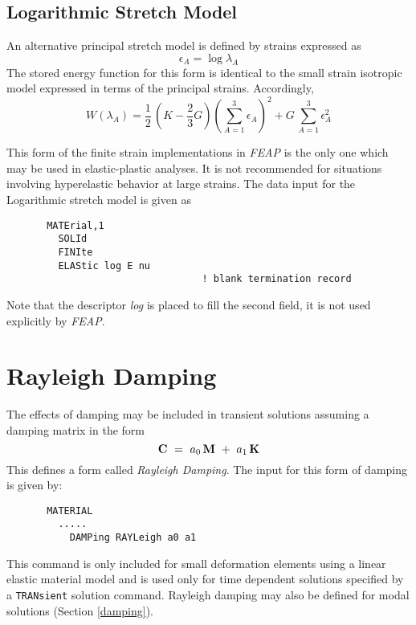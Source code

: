 \subsection{Logarithmic Stretch Model}

An alternative principal stretch model is defined by strains expressed as
\begin{equation}
\epsilon_A = \log{ \lambda_A }
\end{equation}
The stored energy function for this form is identical to the small
strain isotropic model expressed in terms of the principal strains.
Accordingly,
\begin{equation}
W( \lambda_A ) = \frac{1}{2} \, 
\left( K - \frac{2}{3} G \right) \left( \sum_{A=1}^3 \epsilon_A \right)^2
+ G \, \sum_{A=1}^3 \epsilon_A^2
\end{equation}

This form of the finite strain implementations in {\sl FEAP} is the only
one which may be used in elastic-plastic analyses.
It is not recommended for situations involving hyperelastic behavior at
large strains.
The data input for the Logarithmic stretch  model is given as
\begin{verbatim}
       MATErial,1
         SOLId
         FINIte
         ELAStic log E nu
                                  ! blank termination record
\end{verbatim}
Note that the descriptor {\it log} is placed to fill the second field, it is
not used explicitly by {\sl FEAP}.

\section{Rayleigh Damping}
\label{raydamp}

The effects of damping may be included in transient solutions
assuming a damping matrix in the form
\begin{equation}
\mathbf{C} ~=~ a_0 \, \mathbf{M} ~+~ a_1 \, \mathbf{K}
\end{equation}
This defines a form called {\it Rayleigh Damping}.
The input for this form of damping is given by:
\begin{verbatim}
       MATERIAL
         .....
           DAMPing RAYLeigh a0 a1
\end{verbatim}

This command is only included for small deformation elements using a
linear elastic material model and is used only for
time dependent solutions specified by a {\tt TRANsient} solution command.
Rayleigh damping may also be defined for modal solutions
(Section \ref{damping}).

